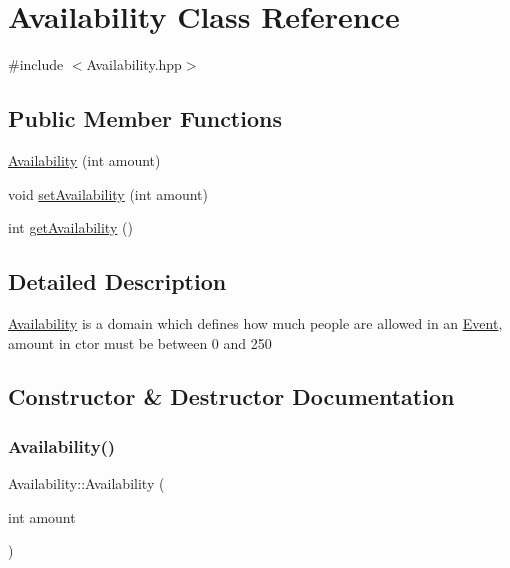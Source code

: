 \hypertarget{class_availability}{}\section{Availability Class Reference}
\label{class_availability}


{\ttfamily \#include $<$Availability.\+hpp$>$}

\subsection*{Public Member Functions}
\begin{DoxyCompactItemize}
\item 
\mbox{\hyperlink{class_availability_a12d2d1387d2c2a6c4fc1befcd6d2cae4}{Availability}} (int amount)
\item 
void \mbox{\hyperlink{class_availability_a315634988dad6624afc1330bc77e08ae}{set\+Availability}} (int amount)
\item 
int \mbox{\hyperlink{class_availability_a9775ae24b35cbe45a9b23b442f9112cd}{get\+Availability}} ()
\end{DoxyCompactItemize}


\subsection{Detailed Description}
\mbox{\hyperlink{class_availability}{Availability}} is a domain which defines how much people are allowed in an \mbox{\hyperlink{class_event}{Event}}, amount in ctor must be between 0 and 250 

\subsection{Constructor \& Destructor Documentation}
\mbox{\label{class_availability_a12d2d1387d2c2a6c4fc1befcd6d2cae4}} 
\subsubsection{\texorpdfstring{Availability()}{Availability()}}
{\footnotesize\ttfamily Availability\+::\+Availability (\begin{DoxyParamCaption}\item[{int}]{amount }\end{DoxyParamCaption})}



